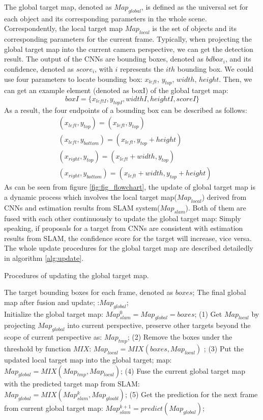 \documentclass[conference]{IEEEtran}
\begin{document}
The global target map, denoted as $Map_{global}$, is defined as the universal set for each object and its corresponding parameters in the whole scene. Correspondently, the local target map $Map_{local}$ is the set of objects and its corresponding parameters for the current frame. Typically, when projecting the global target map into the current camera perspective, we can get the detection result. The output of the CNNs are bounding boxes, denoted as $bdbox_{i}$, and its confidence, denoted as $score_{i}$, with $i$ represents the $ith$ bounding box. We could use four parameters to locate bounding box: $x_{left}$, $y_{top}$, $width$, $height$. 
Then, we can get an example element (denoted as boxI) of the global target map: 
\begin{equation}
boxI=\{x_{leftI},y_{topI},width{I},height{I},score{I}\}
\end{equation} 
As a result, the four endpoints of a bounding box can be described as follows:
\begin{align}
&(x_{left}, y_{top}) =(x_{left}, y_{top}) \\
&(x_{left}, y_{bottom})=(x_{left}, y_{top}+height) \\
&(x_{right}, y_{top})=(x_{left}+width, y_{top}) \\
&(x_{right}, y_{bottom})=(x_{left}+width, y_{top}+height)
\end{align} 
As can be seen from figure \ref{fig:fig_flowchart}, the update of global target map is a dynamic process which involves the local target map($Map_{local}$) derived from CNNs and estimation results from SLAM system($Map_{slam}$). Both of them are fused with each other continuously to update the global target map: Simply speaking, if proposals for a target from CNNs are consistent with estimation results from SLAM, the confidence score for the target will increase, vice versa. The whole update procedures for the global target map are described detailedly in algorithm \ref{alg:update}.


\begin{algorithm}[h]  
	\caption{ Procedures of updating the global target map.}  
	\label{alg:update}  
	\begin{algorithmic}[1]  
		\Require  
		The target bounding boxes  for each frame, denoted as $boxes$; 
		\Ensure  
		The final global map  after fusion and update; :$Map_{global}$;
		 \\	
		 Initialize the global target map: $Map^{0}_{slam}=Map_{global}=boxes$;  
		\Else 
		\State (1) Get $Map_{local}$ by projecting $Map_{global}$ into current perspective, preserve other targets  beyond the scope of current perspective as: $Map_{tmp}$;
		\State (2) Remove the boxes under the threshold by function $MIX$: $Map_{local}=MIX(boxes,Map_{local})$ ;
		\State (3) Put the updated local target map into the global target; map: $Map_{global}=MIX(Map_{tmp},Map_{local})$;
		\State (4) Fuse the current global target map with the predicted target map from SLAM: $Map_{global}=MIX(Map^{k}_{slam},Map_{gloabl})$;
		\State (5) Get the prediction for the next frame from current global target map: $Map^{k+1}_{slam}=predict(Map_{global})$;
		\EndIf
	\end{algorithmic}  
\end{algorithm} 
\end{document}
